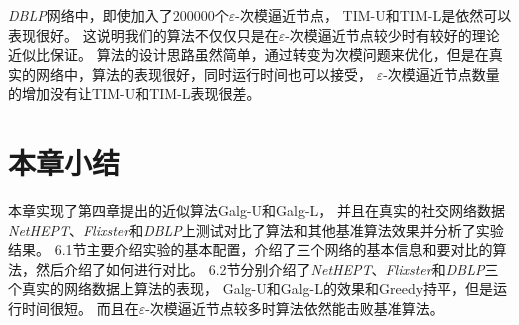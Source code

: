 {\em DBLP}网络中，即使加入了$200000$个$\varepsilon$-次模逼近节点，
{\sf TIM-U}和{\sf TIM-L}是依然可以表现很好。
这说明我们的算法不仅仅只是在$\varepsilon$-次模逼近节点较少时有较好的理论近似比保证。
算法的设计思路虽然简单，通过转变为次模问题来优化，但是在真实的网络中，算法的表现很好，同时运行时间也可以接受，
$\varepsilon$-次模逼近节点数量的增加没有让{\sf TIM-U}和{\sf TIM-L}表现很差。


\section{本章小结}
本章实现了第四章提出的近似算法\textsf{Galg-U}和\textsf{Galg-L}，
并且在真实的社交网络数据{\em NetHEPT}、{\em Flixster}和{\em DBLP}上测试对比了算法和其他基准算法效果并分析了实验结果。
6.1节主要介绍实验的基本配置，介绍了三个网络的基本信息和要对比的算法，然后介绍了如何进行对比。
6.2节分别介绍了{\em NetHEPT}、{\em Flixster}和{\em DBLP}三个真实的网络数据上算法的表现，
\textsf{Galg-U}和\textsf{Galg-L}的效果和\textsf{Greedy}持平，但是运行时间很短。
而且在$\varepsilon$-次模逼近节点较多时算法依然能击败基准算法。





